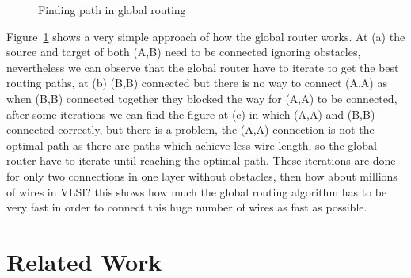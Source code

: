 \documentclass[conference]{IEEEtran}
\begin{document}
\begin{figure}
{
}
\caption{Finding path in global routing}
\label{fig:GlobalRoutingProcess}
\end{figure}
\medskip
Figure~\ref{fig:GlobalRoutingProcess} shows a very simple approach of how the global router works. At (a) the source and target of both (A,B) need to be connected ignoring obstacles, nevertheless we can observe that the global router have to iterate to get the best routing paths, at (b) (B,B) connected but there is no way to connect (A,A) as when (B,B) connected together they blocked the way for (A,A) to be connected, after some iterations we can find the figure at (c) in which (A,A) and (B,B) connected correctly, but there is a problem, the (A,A) connection is not the optimal path as there are paths which achieve less wire length, so the global router have to iterate until reaching the optimal path. These iterations are done for only two connections in one layer without obstacles, then how about millions of wires in VLSI? this shows how much the global routing algorithm has to be very fast in order to connect this huge number of wires as fast as possible.



\section{Related Work}
\end{document}
